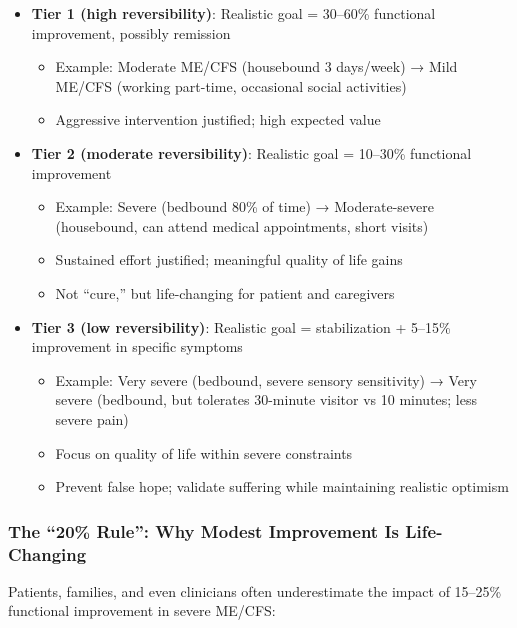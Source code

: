 \begin{itemize}
    \item \textbf{Tier 1 (high reversibility)}: Realistic goal = 30--60\% functional improvement, possibly remission
    \begin{itemize}
        \item Example: Moderate ME/CFS (housebound 3 days/week) → Mild ME/CFS (working part-time, occasional social activities)
        \item Aggressive intervention justified; high expected value
    \end{itemize}

    \item \textbf{Tier 2 (moderate reversibility)}: Realistic goal = 10--30\% functional improvement
    \begin{itemize}
        \item Example: Severe (bedbound 80\% of time) → Moderate-severe (housebound, can attend medical appointments, short visits)
        \item Sustained effort justified; meaningful quality of life gains
        \item Not ``cure,'' but life-changing for patient and caregivers
    \end{itemize}

    \item \textbf{Tier 3 (low reversibility)}: Realistic goal = stabilization + 5--15\% improvement in specific symptoms
    \begin{itemize}
        \item Example: Very severe (bedbound, severe sensory sensitivity) → Very severe (bedbound, but tolerates 30-minute visitor vs 10 minutes; less severe pain)
        \item Focus on quality of life within severe constraints
        \item Prevent false hope; validate suffering while maintaining realistic optimism
    \end{itemize}
\end{itemize}

\subsubsection{The ``20\% Rule'': Why Modest Improvement Is Life-Changing}

Patients, families, and even clinicians often underestimate the impact of 15--25\% functional improvement in severe ME/CFS:

